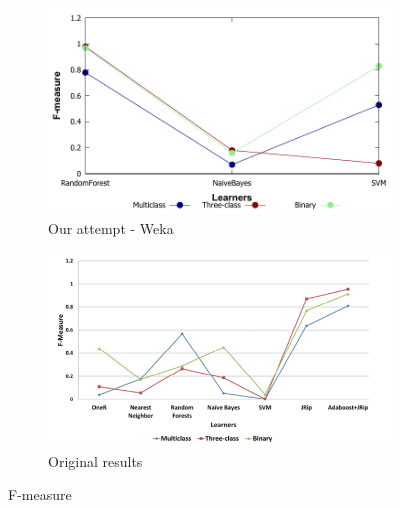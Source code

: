 \begin{figure}[H]
    \centering
    \begin{subfigure}[t]{0.5\textwidth}
        \includegraphics[width=\linewidth]{images/weka_f1}
        \caption{Our attempt - Weka}
    \end{subfigure}%
    \begin{subfigure}[t]{0.5\textwidth}
        \includegraphics[width=\linewidth]{images/weka_f1_cite.png}
        \caption{Original results \cite{borges_hink_machine_2014-1}}
    \end{subfigure}
    \caption{F-measure}
    \label{fig:f1}
\end{figure}

